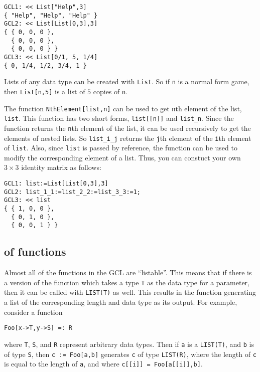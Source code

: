 \begin{verbatim}
GCL1: << List["Help",3]
{ "Help", "Help", "Help" }
GCL2: << List[List[0,3],3]
{ { 0, 0, 0 },
  { 0, 0, 0 },
  { 0, 0, 0 } }
GCL3: << List[0/1, 5, 1/4]
{ 0, 1/4, 1/2, 3/4, 1 }
\end{verbatim}

\noindent
Lists of any data type can be created with \verb+List+.  So if
\verb+n+ is a normal form game, then \verb+List[n,5]+ is a list of $5$
copies of \verb+n+.

The function \verb+NthElement[list,n]+ can be used
to get \verb+n+th element of the list, \verb+list+.  This function has
two short forms, \verb+list[[n]]+ and \verb+list_n+.  Since the
function returns the \verb+n+th element of the list, it can be used
recursively to get the elements of nested lists.  So \verb+list_i_j+
returns the \verb+j+th element of the \verb+i+th element of
\verb+list+.  Also, since \verb+list+ is passed by reference, the
function can be used to modify the corresponding element of a list.
Thus, you can constuct your own $3\times 3$ identity matrix as
follows:

\begin{verbatim}
GCL1: list:=List[List[0,3],3]
GCL2: list_1_1:=list_2_2:=list_3_3:=1;
GCL3: << list
{ { 1, 0, 0 },
  { 0, 1, 0 },
  { 0, 0, 1 } }
\end{verbatim}

\subsection{ of functions}

Almost all of the functions in the GCL are ``listable''.  This means
that if there is a version of the function which takes a type \verb+T+
as the data type for a parameter, then it can be called with
\verb+LIST(T)+ as well.  This results in the function generating a
list of the corresponding length and data type as its output.  For
example, consider a function

\begin{verbatim}
Foo[x->T,y->S] =: R
\end{verbatim}

\noindent
where \verb+T+, \verb+S+, and \verb+R+ represent arbitrary data types.
Then if \verb+a+ is a \verb+LIST(T)+, and \verb+b+ is of type
\verb+S+, then \verb+c := Foo[a,b]+ generates \verb+c+ of type
\verb+LIST(R)+, where the length of \verb+c+ is equal to the length of
\verb+a+, and where \verb+c[[i]] = Foo[a[[i]],b]+.

